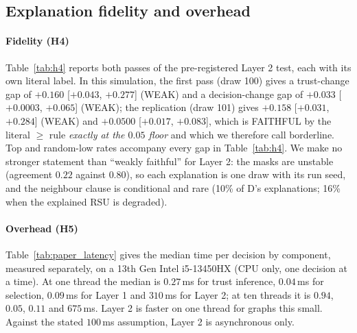 \subsection{Explanation fidelity and overhead}
\label{sec:overhead}

\paragraph*{Fidelity (H4)}
Table~\ref{tab:h4} reports both passes of the pre-registered Layer 2 test, each with its own literal label.
In this simulation, the first pass (draw 100) gives a trust-change gap of $+0.160$ [$+0.043$, $+0.277$] (WEAK) and a decision-change gap of $+0.033$ [$+0.0003$, $+0.065$] (WEAK); the replication (draw 101) gives $+0.158$ [$+0.031$, $+0.284$] (WEAK) and $+0.0500$ [$+0.017$, $+0.083$], which is FAITHFUL by the literal $\ge$ rule \emph{exactly at the $0.05$ floor} and which we therefore call borderline.
Top and random-low rates accompany every gap in Table~\ref{tab:h4}.
We make no stronger statement than ``weakly faithful'' for Layer 2: the masks are unstable (agreement $0.22$ against $0.80$), so each explanation is one draw with its run seed, and the neighbour clause is conditional and rare (10\% of D's explanations; 16\% when the explained RSU is degraded).

\paragraph*{Overhead (H5)}
Table~\ref{tab:paper_latency} gives the median time per decision by component, measured separately, on a 13th Gen Intel i5-13450HX (CPU only, one decision at a time).
At one thread the median is $0.27$\,ms for trust inference, $0.04$\,ms for selection, $0.09$\,ms for Layer 1 and $310$\,ms for Layer 2; at ten threads it is $0.94$, $0.05$, $0.11$ and $675$\,ms.
Layer 2 is faster on one thread for graphs this small.
Against the stated $100$\,ms assumption, Layer 2 is asynchronous only.



